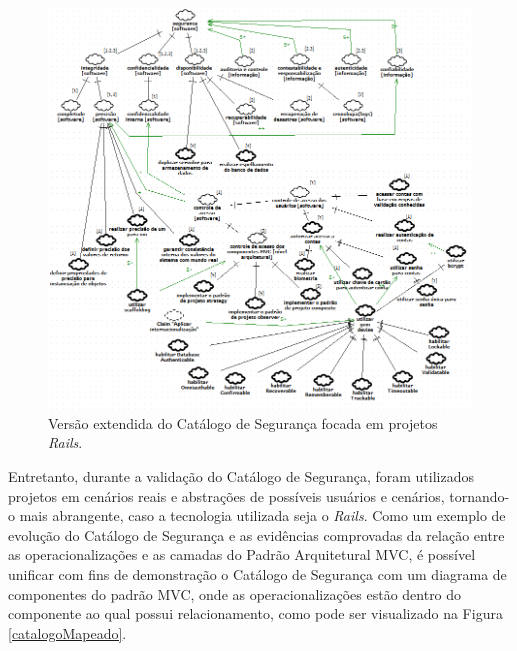 \begin{figure}[h!]
	\centering
	\includegraphics[keepaspectratio=true,scale=0.65]{figuras/catalogoFull.PNG}
	\caption{Versão extendida do Catálogo de Segurança focada em projetos \textit{Rails}.}
	\label{catalogoFull}
\end{figure}


Entretanto, durante a validação do Catálogo de Segurança, foram utilizados projetos em cenários reais e abstrações de possíveis usuários e cenários, tornando-o mais abrangente, caso a tecnologia utilizada seja o \textit{Rails}. Como um exemplo de evolução do Catálogo de Segurança e as evidências comprovadas da relação entre as operacionalizações e as camadas do Padrão Arquitetural MVC, é possível unificar com fins de demonstração o Catálogo de Segurança com um diagrama de componentes do padrão MVC, onde as operacionalizações estão dentro do componente ao qual possui relacionamento, como pode ser visualizado na Figura \ref{catalogoMapeado}. 


